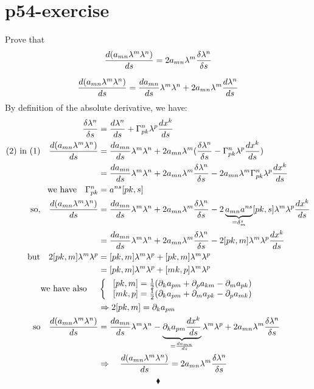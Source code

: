 \section{p54-exercise}
\begin{tcolorbox}
Prove that $$\dv{(a_{mn}\lambda^m\lambda^n)}{s} = 2 a_{mn}\lambda^m \frac{\delta\lambda^n}{\delta s}$$
\end{tcolorbox}
\begin{align} \dv{(a_{mn}\lambda^m\lambda^n)}{s}= \dv{a_{mn}}{s}\lambda^m\lambda^n+2a_{mn}\lambda^m \dv{\lambda^n}{s}
\end{align}
By definition of the absolute derivative, we have:
\begin{align}
\frac{\delta \lambda^n}{\delta s}& =\dv{\lambda ^n}{s}  + \Gamma^n_{pk}\lambda^p\dv{x^k}{s} \\
\text{(2) in (1)}\quad \dv{(a_{mn}\lambda^m\lambda^n)}{s}&= \dv{a_{mn}}{s}\lambda^m\lambda^n+2a_{mn}\lambda^m (\frac{\delta \lambda^n}{\delta s} - \Gamma^n_{pk}\lambda^p\dv{x^k}{s})\\
\ &= \dv{a_{mn}}{s}\lambda^m\lambda^n+2a_{mn}\lambda^m \frac{\delta \lambda^n}{\delta s} - 2a_{mn}\lambda^m \Gamma^n_{pk}\lambda^p\dv{x^k}{s}\\
\text{we have} \quad \Gamma^n_{pk} &= a^{ns}[pk,s]\\
\text{so,} \quad \dv{(a_{mn}\lambda^m\lambda^n)}{s}&= \dv{a_{mn}}{s}\lambda^m\lambda^n+2a_{mn}\lambda^m \frac{\delta \lambda^n}{\delta s} - 2\underbrace{a_{mn}a^{ns}}_{=\delta^s_m}[pk,s]\lambda^m \lambda^p\dv{x^k}{s}\\
&= \dv{a_{mn}}{s}\lambda^m\lambda^n+2a_{mn}\lambda^m \frac{\delta \lambda^n}{\delta s} - 2[pk,m]\lambda^m \lambda^p\dv{x^k}{s}\\
\text{but} \quad 2[pk,m]\lambda^m\lambda^p &= [pk,m]\lambda^m\lambda^p+[pk,m]\lambda^m\lambda^p\\
&= [pk,m]\lambda^m\lambda^p+[mk,p]\lambda^m\lambda^p\\
\text{we have also }\quad &\left \{ \begin{array}{c}
\ [pk,m] = \frac{1}{2}(\partial _k a_{pm} + \partial _p a_{km}-\partial _m a_{pk})\\
\ [mk,p] = \frac{1}{2}(\partial _k a_{pm} + \partial _m a_{pk}-\partial _p a_{mk})\\
\end{array}\right.\\
\ &\Rightarrow 2[pk,m] = \partial _k a_{pm}\\
\text{so} \quad \dv{(a_{mn}\lambda^m\lambda^n)}{s} &= \dv{a_{mn}}{s}\lambda^m\lambda^n - \underbrace{ \partial _k a_{pm}\dv{x^k}{s}}_{=\dv{a_{mn}}{s}} \lambda^m \lambda^p +2a_{mn}\lambda^m \frac{\delta \lambda^n}{\delta s} \\
\ & \Rightarrow \quad  \dv{(a_{mn}\lambda^m\lambda^n)}{s} = 2a_{mn}\lambda^m \frac{\delta \lambda^n}{\delta s} 
\end{align} 
$$\blacklozenge$$
\newpage

